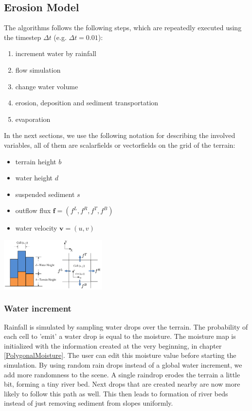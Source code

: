 \documentclass[journal, letterpaper]{IEEEtran}
\begin{document}
\subsection{Erosion Model}
The algorithms follows the following steps, which are repeatedly executed using the timestep $\Delta t$ (e.g. $\Delta t = 0.01$):
\begin{enumerate}
	\item increment water by rainfall
	\item flow simulation
	\item change water volume
	\item erosion, deposition and sediment transportation
	\item evaporation
\end{enumerate}
In the next sections, we use the following notation for describing the involved variables, all of them are scalarfields or vectorfields on the grid of the terrain:
\begin{itemize}
	\item terrain height $b$
	\item water height $d$
	\item suspended sediment $s$
	\item outflow flux $\textbf{f}=(f^L,f^R,f^T,f^B)$
	\item water velocity $\textbf{v}=(u,v)$
\end{itemize}
\begin{center}
	\includegraphics[width=0.4\textwidth]{images/erosionVariables}
\end{center}

\subsubsection{Water increment}
Rainfall is simulated by sampling water drops over the terrain. The probability of each cell to 'emit' a water drop is equal to the moisture. The moisture map is initialized with the information created at the very beginning, in chapter \ref{PolygonalMoisture}. The user can edit this moisture value before starting the simulation. By using random rain drops instead of a global water increment, we add more randomness to the scene. A single raindrop erodes the terrain a little bit, forming a tiny river bed. Next drops that are created nearby are now more likely to follow this path as well. This then leads to formation of river beds instead of just removing sediment from slopes uniformly.
\end{document}
